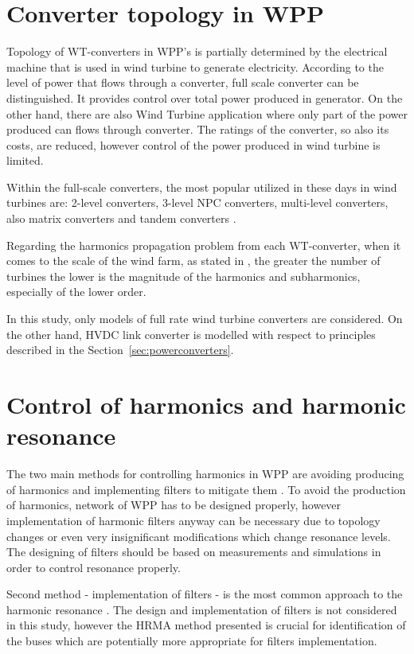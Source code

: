\documentclass[12pt]{report} %
\begin{document}
\section{Converter topology in WPP}
Topology of WT-converters in WPP's is partially determined by the electrical machine that is used in wind turbine to generate electricity. According to the level of power that flows through a converter, full scale converter can be distinguished. It provides control over total power produced in generator. On the other hand, there are also Wind Turbine application where only part of the power produced can flows through converter. The ratings of the converter, so also its costs, are reduced, however control of the power produced in wind turbine is limited. 

Within the full-scale converters, the most popular utilized in these days in wind turbines are: 2-level converters, 3-level NPC converters, multi-level converters, also matrix converters and tandem converters \cite{pham2013}.

Regarding the harmonics propagation problem from each WT-converter, when it comes to the scale of the wind farm, as stated in \cite{das}, the greater the number of turbines the lower is the magnitude of the harmonics and subharmonics, especially of the lower order.

In this study, only models of full rate wind turbine converters are considered. On the other hand, HVDC link converter is modelled with respect to principles described in the Section~\ref{sec:powerconverters}.

\section{Control of harmonics and harmonic resonance}
The two main methods for controlling harmonics in WPP are avoiding producing of harmonics and implementing filters to mitigate them \cite{bradt2012}. To avoid the production of harmonics, network of WPP has to be designed properly, however implementation of harmonic filters anyway can be necessary due to topology changes or even very insignificant modifications which change resonance levels. The designing of filters should be based on measurements and simulations in order to control resonance properly.

Second method - implementation of filters - is the most common approach to the harmonic resonance \cite{bradt2012}. The design and implementation of filters is not considered in this study, however the HRMA method presented is crucial for identification of the buses which are potentially more appropriate for filters implementation.
\end{document}
